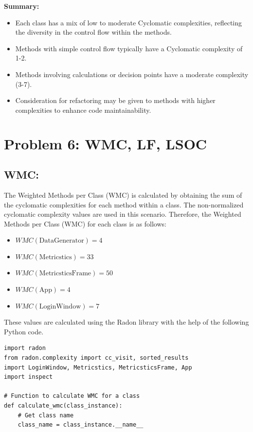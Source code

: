 {{{{\textbf{\normalsize{Summary: }}
\normalsize{\begin{itemize}[noitemsep]
    \item Each class has a mix of low to moderate Cyclomatic complexities, reflecting the diversity in the control flow within the methods. 
    \item Methods with simple control flow typically have a Cyclomatic complexity of 1-2. 
    \item Methods involving calculations or decision points have a moderate complexity (3-7). 
    \item Consideration for refactoring may be given to methods with higher complexities to enhance code maintainability. 
    \linebreak
\end{itemize}}



\newpage
\section{Problem 6: WMC, LF, LSOC }
\subsection{WMC: }
The Weighted Methods per Class (WMC) is calculated by obtaining the sum of the cyclomatic complexities for each method within a class. The non-normalized cyclomatic complexity values are used in this scenario. Therefore, the Weighted Methods per Class (WMC) for each class is as follows:

\begin{itemize}
  \item $WMC(\text{DataGenerator}) = 4$
  \item $WMC(\text{Metricstics}) = 33$
  \item $WMC(\text{MetricsticsFrame}) = 50$
  \item $WMC(\text{App}) = 4$
  \item $WMC(\text{LoginWindow}) = 7$
\end{itemize}

These values are calculated using the Radon library with the help of the following Python code.

\begin{verbatim}
import radon
from radon.complexity import cc_visit, sorted_results
import LoginWindow, Metricstics, MetricsticsFrame, App
import inspect

# Function to calculate WMC for a class
def calculate_wmc(class_instance):
    # Get class name
    class_name = class_instance.__name__


\end{verbatim}}}}}
